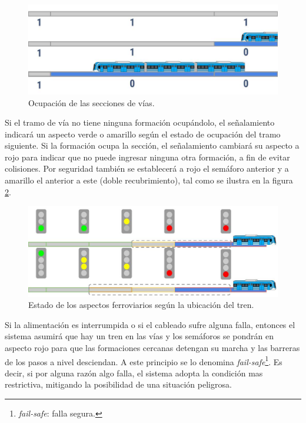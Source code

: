 			\begin{figure}[h]
				\centering
				\includegraphics[scale=.4]{./Figures/Ocupacion}
				\caption{Ocupación de las secciones de vías.}
				\label{fig:Ocupacion}
			\end{figure}
			
			
			Si el tramo de vía no tiene ninguna formación ocupándolo, el señalamiento indicará un aspecto verde o amarillo según el estado de ocupación del tramo siguiente. Si la formación ocupa la sección, el señalamiento cambiará su aspecto a rojo para indicar que no puede ingresar ninguna otra formación, a fin de evitar colisiones. Por seguridad también se establecerá a rojo el semáforo anterior y a amarillo el anterior a este (doble recubrimiento), tal como se ilustra en la figura \ref{fig:Recubrimiento}.			
					
			\begin{figure}[h]
				\centering
				\includegraphics[scale=.4]{./Figures/Recubrimiento}
				\caption{Estado de los aspectos ferroviarios según la ubicación del tren.}
				\label{fig:Recubrimiento}
			\end{figure}			
			
			Si la alimentación es interrumpida o si el cableado sufre alguna falla, entonces el sistema asumirá que hay un tren en las vías y los semáforos se pondrán en aspecto rojo para que las formaciones cercanas detengan su marcha y las barreras de los pasos a nivel desciendan. A este principio se lo denomina \textit{fail-safe}\footnote{\textit{fail-safe}: falla segura.}. Es decir, si por alguna razón algo falla, el sistema adopta la condición mas restrictiva, mitigando la posibilidad de una situación peligrosa. 		
			

